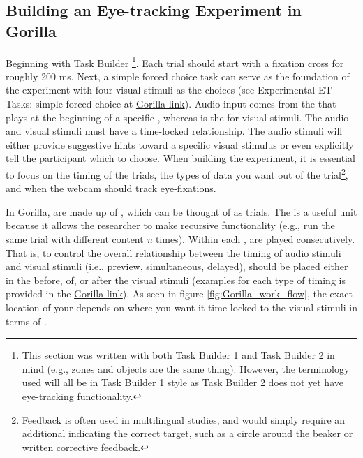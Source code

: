 \subsection{Building an Eye-tracking Experiment in Gorilla}

Beginning with Task Builder \footnote{This section was written with both Task Builder 1 and Task Builder 2 in mind (e.g., zones and objects are the same thing). However, the terminology used will all be in Task Builder 1 style as Task Builder 2 does not yet have eye-tracking functionality.}. Each trial should start with a fixation cross for roughly 200 ms. Next, a simple forced choice task can serve as the foundation of the experiment with four visual stimuli as the choices (see Experimental ET Tasks: simple forced choice at \href{https://app.gorilla.sc/openmaterials/715241}{Gorilla link}). Audio input comes from the   that plays at the beginning of a specific , whereas  is the  for visual stimuli. The audio and visual stimuli must have a time-locked relationship. The audio stimuli will either provide suggestive hints toward a specific visual stimulus or even explicitly tell the participant which to choose. When building the experiment, it is essential to focus on the timing of the trials, the types of data you want out of the trial\footnote{Feedback is often used in multilingual studies, and would simply require an additional  indicating the correct target, such as a circle around the beaker or written corrective feedback.}, and when the webcam should track eye-fixations. 

In Gorilla,  are made up of , which can be thought of as trials. The  is a useful unit because it allows the researcher to make recursive functionality (e.g., run the same trial with different content \textit{n} times). Within each ,   are played consecutively. That is, to control the overall relationship between the timing of audio stimuli and visual stimuli (i.e., preview, simultaneous, delayed),  should be placed either in the  before, of, or after the visual stimuli (examples for each type of timing is provided in the \href{https://app.gorilla.sc/openmaterials/715241}{Gorilla link}). As seen in figure \ref{fig:Gorilla_work_flow}, the exact location of your  depends on where you want it time-locked to the visual stimuli in terms of . 

